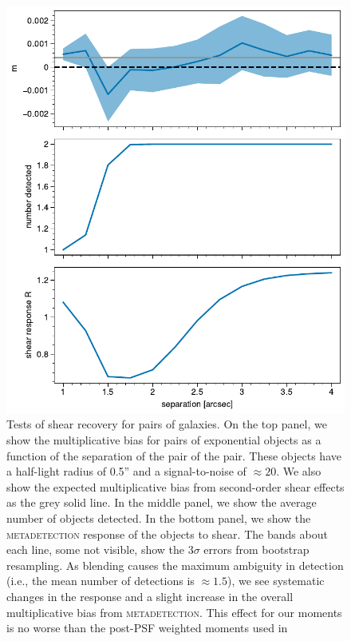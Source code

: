 \documentclass[twocolappendix, appendixfloats, numberedappendix, twocolumn, apj]{openjournal}
\newcommand{\mdet}{\textsc{metadetection}\xspace}
\begin{document}
\begin{figure}
  \centering
  \vspace{1em}
  \includegraphics[width=\columnwidth]{figures/pair-plot.pdf}
  \caption{
    Tests of shear recovery for pairs of galaxies. On the top panel, we show
    the multiplicative bias for pairs of exponential objects as a function of
    the separation of the pair of the pair. These objects have a half-light radius
    of 0.5'' and a signal-to-noise of $\approx 20$. We also show the expected multiplicative
    bias from second-order shear effects as the grey solid line. In the middle panel, we show
    the average number of objects detected. In the bottom panel, we show the
    \mdet response of the objects to shear. The bands about each line, some not
    visible, show the 3$\sigma$ errors from bootstrap resampling. As blending
    causes the maximum ambiguity in detection (i.e., the mean number of detections
    is $\approx 1.5$), we see systematic changes in the response and a slight
    increase in the overall multiplicative bias from \mdet. This effect for our
    moments is no worse than the post-PSF weighted moments used in %
    \label{fig:shearpair}
  }
\end{figure}
\end{document}
